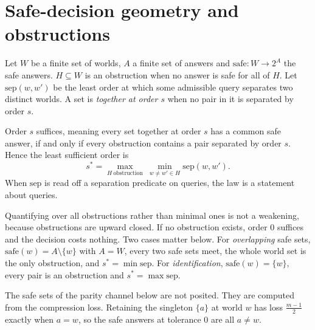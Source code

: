 \section{Safe-decision geometry and obstructions}
\label{sec:geometry}

Let $W$ be a finite set of worlds, $A$ a finite set of answers and
$\mathrm{safe}:W\to 2^{A}$ the safe answers. $H\subseteq W$ is an obstruction when no answer is
safe for all of $H$. Let $\mathrm{sep}(w,w')$ be the least order at which some admissible query
separates two distinct worlds. A set is \emph{together at order $s$} when no pair in it is
separated by order $s$.

\begin{theorem}
\label{thm:safelaw}
Order $s$ suffices, meaning every set together at order $s$ has a common safe answer, if and
only if every obstruction contains a pair separated by order $s$. Hence the least sufficient
order is
\[
s^{*}=\max_{H\ \text{obstruction}}\ \min_{w\ne w'\in H}\mathrm{sep}(w,w').
\]
When $\mathrm{sep}$ is read off a separation predicate on queries, the law is a statement about
queries.
\end{theorem}


Quantifying over all obstructions rather than minimal ones is not a weakening, because
obstructions are upward closed. If no obstruction exists, order $0$ suffices and the decision
costs nothing. Two cases matter below. For \emph{overlapping} safe sets,
$\mathrm{safe}(w)=A\setminus\{w\}$ with $A=W$, every two safe sets meet, the whole world set is
the only obstruction, and $s^{*}=\min\mathrm{sep}$. For \emph{identification},
$\mathrm{safe}(w)=\{w\}$, every pair is an obstruction and $s^{*}=\max\mathrm{sep}$.


The safe sets of the parity channel below are not posited. They are computed from the
compression loss. Retaining the singleton $\{a\}$ at world $w$ has loss $\frac{m-1}{2}$ exactly
when $a=w$, so the safe answers at tolerance $0$ are all $a\ne w$.

